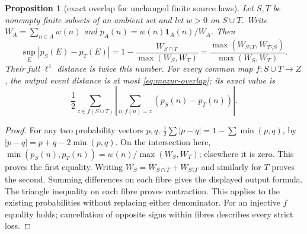 \documentclass[11pt]{article}
\newtheorem{proposition}{Proposition}
\theoremstyle{remark}\newtheorem{remark}[proposition]{Remark}
\begin{document}
\begin{proposition}[exact overlap for unchanged finite source laws]
\label{prop:mazur-source-overlap}
Let \(S,T\) be nonempty finite subsets of an ambient set and let \(w>0\)
on \(S\cup T\). Write \(W_A=\sum_{n\in A}w(n)\) and
\(p_A(n)=w(n)\mathbf1_A(n)/W_A\).
Then
\begin{equation}
 \sup_E|p_S(E)-p_T(E)|
 =1-\frac{W_{S\cap T}}{\max(W_S,W_T)}
 =\frac{\max(W_{S\setminus T},W_{T\setminus S})}
             {\max(W_S,W_T)}.
 \label{eq:mazur-overlap}
\end{equation}
Their full \(\ell^1\) distance is twice this number.
For every common map \(f:S\cup T\to Z\), the output event distance
is at most \eqref{eq:mazur-overlap}; its exact value is
\[
 \frac12\sum_{z\in f(S\cup T)}
 \left|\sum_{n:f(n)=z}(p_S(n)-p_T(n))\right|.
\]
\end{proposition}
\begin{proof}
For any two probability vectors \(p,q\),
\(\frac12\sum|p-q|=1-\sum\min(p,q)\), by
\(|p-q|=p+q-2\min(p,q)\). On the intersection here,
\(\min(p_S(n),p_T(n))=w(n)/\max(W_S,W_T)\);
elsewhere it is zero. This proves the first equality. Writing
\(W_S=W_{S\cap T}+W_{S\setminus T}\) and similarly for \(T\)
proves the second. Summing differences on each fibre gives the
displayed output formula. The triangle inequality on each fibre
proves contraction. This applies to the existing probabilities
without replacing either denominator. For an injective \(f\) equality
holds; cancellation of opposite signs within fibres describes every
strict loss.
\end{proof}
\end{document}
